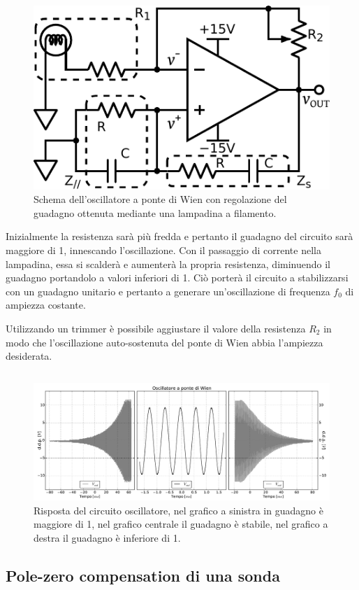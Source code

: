 \begin{figure}
\centering
\includegraphics[width=.35\textwidth]{../E08/latex/osc_w_lamp.pdf}
\caption{Schema dell'oscillatore a ponte di Wien con regolazione del guadagno ottenuta mediante una lampadina a filamento.}
\label{cir8:with_lamp}
\end{figure}

Inizialmente la resistenza sarà più fredda e pertanto il guadagno del circuito sarà maggiore di \num{1}, innescando l'oscillazione.
Con il passaggio di corrente nella lampadina, essa si scalderà e aumenterà la propria resistenza, diminuendo il guadagno portandolo a valori inferiori di \num{1}.
Ciò porterà il circuito a stabilizzarsi con un guadagno unitario e pertanto a generare un'oscillazione di frequenza $f_0$ di ampiezza costante.

Utilizzando un trimmer è possibile aggiustare il valore della resistenza $R_2$ in modo che l'oscillazione auto-sostenuta del ponte di Wien abbia l'ampiezza desiderata.

$$$$
$$$$

\begin{figure}[htpc]
\centering
\includegraphics[width=.95\textwidth]{../E08/latex/grey_wien.pdf}
\caption{Risposta del circuito oscillatore, nel grafico a sinistra in guadagno è maggiore di \num{1}, nel grafico centrale il guadagno è stabile, nel grafico a destra il guadagno è inferiore di \num{1}.}
\label{fig8:wien}
\end{figure}

\subsection{Pole-zero compensation di una sonda}

